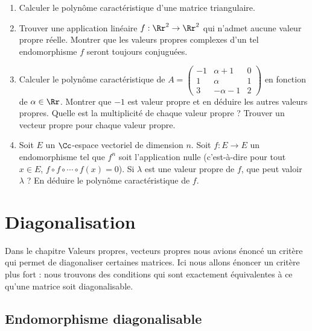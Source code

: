 \documentclass[12pt, class=report,crop=false]{standalone}
\begin{document}
\begin{miniexercices}
\sauteligne
\begin{enumerate}
  \item Calculer le polynôme caractéristique d'une matrice triangulaire.

  \item Trouver une application linéaire $f : \Rr^2 \to \Rr^2$ qui n'admet aucune valeur propre réelle. Montrer que les valeurs propres complexes d'un tel endomorphisme $f$ seront toujours conjuguées.
  
  \item Calculer le polynôme caractéristique de $A
  = \left(\begin{smallmatrix}
  -1 & \alpha + 1 & 0 \\
1 & \alpha & 1 \\
3 & - \alpha - 1 & 2
\end{smallmatrix}\right)$ en fonction de $\alpha \in \Rr$. Montrer que $-1$ est valeur propre et en déduire les autres valeurs propres.
Quelle est la multiplicité de chaque valeur propre ? Trouver un vecteur propre pour chaque valeur propre.
  
  \item Soit $E$ un $\Cc$-espace vectoriel de dimension $n$. 
  Soit $f : E \to E$ un endomorphisme tel que $f^n$ soit l'application nulle (c'est-à-dire
  pour tout $x\in E$, $f\circ f \circ \cdots \circ f(x) = 0$). Si $\lambda$ est une valeur propre de $f$, que peut valoir $\lambda$ ? En déduire le polynôme caractéristique de $f$.
  
\end{enumerate}
\end{miniexercices}



\section{Diagonalisation}


Dans le chapitre \og{}Valeurs propres, vecteurs propres\fg{}
nous avions énoncé un critère qui permet de diagonaliser certaines matrices.
Ici nous allons énoncer un critère plus fort : nous trouvons des conditions qui sont exactement équivalentes à ce qu'une matrice soit diagonalisable.


\subsection{Endomorphisme diagonalisable}
\end{document}
